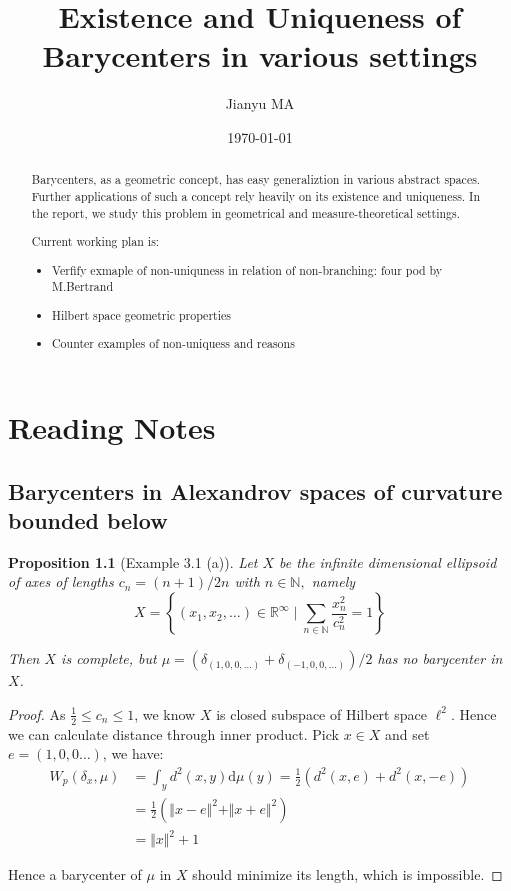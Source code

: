 \documentclass{report}
\newtheorem{prop}{Proposition}
\newcommand{\diff}{\mathrm{d}}
\begin{document}
\author{Jianyu MA}
\date{\today}
\title{Existence and Uniqueness of Barycenters in various settings}
\maketitle

\begin{abstract}
	Barycenters, as a geometric concept, has easy generaliztion in various abstract spaces. Further applications of such a concept rely heavily on its existence and uniqueness. In the report, we study this problem in geometrical and measure-theoretical settings.

	Current working plan is:
	\begin{itemize}
		\item Verfify exmaple of non-uniquness in relation of non-branching: four pod by M.Bertrand
		\item Hilbert space geometric properties
		\item Counter examples of non-uniquess and reasons
	\end{itemize}
\end{abstract}

\tableofcontents

\chapter{Reading Notes}
\section{Barycenters in Alexandrov spaces of curvature bounded below}
\begin{prop}[Example 3.1 (a)]
	Let \( X \) be the infinite dimensional ellipsoid of axes of lengths \( c _ { n } = ( n + 1 ) / 2 n \) with \( n \in \mathbb { N } , \) namely \[ X = \left\{ \left( x _ { 1 } , x _ { 2 } , \ldots \right) \in \mathbb { R } ^ { \infty } \mid \sum _ { n \in \mathbb { N } } \frac { x _ { n } ^ { 2 } } { c _ { n } ^ { 2 } } = 1 \right\} \]

	Then \( X \) is complete, but \( \mu = \left( \delta _ { ( 1,0,0 , \ldots ) } + \delta _ { ( - 1,0,0 , \ldots ) } \right) / 2 \) has no barycenter in \( X \).
\end{prop}

\begin{proof}
	As $ \frac{1}{2} \leq c_{n} \leq 1$, we know $X$ is closed subspace of Hilbert space $\ell^2$. Hence we can calculate distance through inner product. Pick $ x \in X$ and set $ e=(1,0,0\ldots)$, we have:
	\begin{align*}
		W_p(\delta_x, \mu) &= \int_{y} d^2(x, y) \diff \mu(y) = \frac{1}{2}(d^2(x,e)+d^2(x,-e))\\
											 &=\frac{1}{2}(\Vert x - e \Vert^2 + \Vert x + e \Vert^2) \\
											 &=\Vert x \Vert^2 + 1
\end{align*}

Hence a barycenter of $\mu$ in $X$ should minimize its length, which is impossible.
\end{proof}
\end{document}
